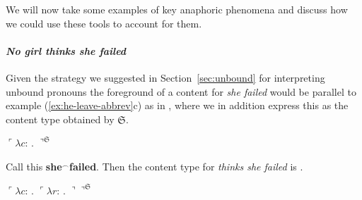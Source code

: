 We will now take some examples of key anaphoric phenomena and discuss
how we could use these tools to account for them.



\paragraph{\textit{No girl thinks she failed}}
\label{sec:direct-binding}

Given the strategy we suggested in Section~\ref{sec:unbound} for
interpreting unbound pronouns  the foreground of a content for
\textit{she failed} would be parallel to example
(\ref{ex:he-leave-abbrev}c) as in \nexteg{}, where we in addition
express this as the content type obtained by $\mathfrak{S}$.
\begin{ex}
  

$\ulcorner\lambda c$:
  . 
         $\urcorner^{\mathfrak{S}}$

\end{ex} 
Call this \textbf{she$^\frown$failed}.  Then the 
content type for \textit{thinks she failed} is \nexteg{}.
\begin{ex}
  $\ulcorner\lambda c$:
              . $\ulcorner\lambda r$: . 
              $\urcorner\urcorner^{\mathfrak{S}}$
\label{ex:thinks-she-failed-x0} 
\end{ex} 
